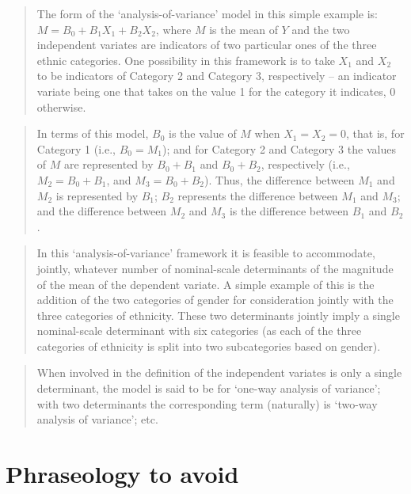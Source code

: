 \documentclass[]{book}
\begin{document}
\begin{quote}
The form of the `analysis-of-variance' model in this simple example is: \(M = B_0 + B_1 X_1 + B_2 X_2\),
where \(M\) is the mean of \(Y\) and the two independent variates are indicators of two particular ones of the three ethnic categories. One possibility in this framework is to take \(X_1\) and \(X_2\) to be indicators of Category 2 and Category 3, respectively -- an indicator variate being one that takes on the value 1 for the category it indicates, 0 otherwise.
\end{quote}

\begin{quote}
In terms of this model, \(B_0\) is the value of \(M\) when \(X_1 = X_2 = 0\), that is, for Category 1 (i.e., \(B_0 = M_1\)); and for Category 2 and Category 3 the values of \(M\) are represented by \(B_0 + B_1\) and \(B_0 + B_2\), respectively (i.e., \(M_2 = B_0 + B_1\), and \(M_3 = B_0 + B_2\)). Thus, the difference between \(M_1\) and \(M_2\) is represented by \(B_1\); \(B_2\) represents the difference between \(M_1\) and \(M_3\); and the difference between \(M_2\) and \(M_3\) is the difference between \(B_1\) and \(B_2\).
\end{quote}

\begin{quote}
In this `analysis-of-variance' framework it is feasible to accommodate, jointly, whatever number of nominal-scale determinants of the magnitude of the mean of the dependent variate. A simple example of this is the addition of the two categories of gender for consideration jointly with the three categories of ethnicity. These two determinants jointly imply a single nominal-scale determinant with six categories (as each of the three categories of ethnicity is split into two subcategories based on gender).
\end{quote}

\begin{quote}
When involved in the definition of the independent variates is only a single determinant, the model is said to be for `one-way analysis of variance'; with two determinants the corresponding term (naturally) is `two-way analysis of variance'; etc.
\end{quote}

\hypertarget{phraseology-to-avoid-1}{%
\section{Phraseology to avoid}\label{phraseology-to-avoid-1}}
\end{document}
